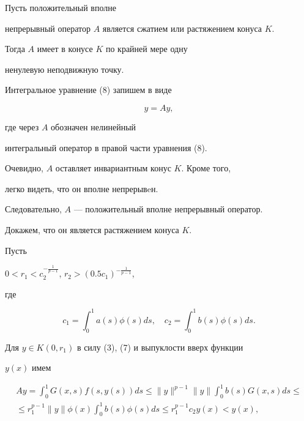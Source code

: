 \begin{thm}


Пусть положительный вполне 


непрерывный оператор $A$ является сжатием или растяжением конуса $K$.


Тогда $A$ имеет в конусе $K$ по крайней мере одну 


ненулевую неподвижную точку.


\end{thm}


 


Интегральное уравнение (8) запишем в виде


$$


y=Ay,


$$


где через $A$ обозначен нелинейный 


интегральный оператор в правой части уравнения (8).


Очевидно, $A$ оставляет инвариантным конус $K$. Кроме того, 


легко видеть, что он вполне непрерывeн.


Следовательно, $A$ --- положительный вполне непрерывный оператор.


Докажем, что он является растяжением конуса $K$. 





Пусть 


$0<r_1<c_2^{-\frac{1}{p-1}}$, $r_2 >(0.5c_1)^{-\frac{1}{p-1}}$,


где


$$ 


c_1=\int_0^1a(s)\phi(s) ds,\quad c_2=\int_0^1b(s)\phi(s)ds. 


$$


Для $y\in K(0,r_1)$ в силу (3), (7) и выпуклости вверх функции


$y(x)$ имем


\begin{multline*}


Ay=\int_0^1 G(x,s)f(s,y(s)) ds\leq \| y\|^{p-1}\| y\|


\int_0^1 b(s)G(x,s)ds\leq \\


%


\leq r_1^{p-1}\| y\| \phi(x) \int_0^1 b(s)\phi(s)ds


\leq r_1^{p-1} c_2y(x)<y(x),


\end{multline*} 


